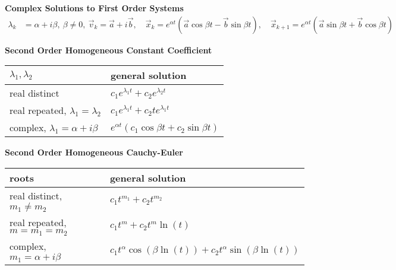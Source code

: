 \begin{center}

    \textbf{Complex Solutions to First Order Systems}
    \begin{align*}
        \lambda_k &= \alpha + i \beta, \ \beta \ne 0 , \ \vec v_k = \vec a + i \vec b, \quad 
        \vec x_k = e^{\alpha t} (\vec a \cos \beta t - \vec b \sin \beta t), 
        \quad 
        \vec x_{k+1} = e^{\alpha t} (\vec a \sin \beta t + \vec b \cos \beta t)
    \end{align*}

    \vspace{4pt}
    \textbf{Second Order Homogeneous Constant Coefficient}
    \begin{tabular}{ p{4.2cm} p{4.6cm} }
        
        $\lambda_1, \lambda_2$ &  general solution 
        \\[2pt] \hline 
        real distinct &  $c_1 e^{\lambda_1 t} + c_2 e^{\lambda_2 t}$\\       
        real repeated, $\lambda_1 = \lambda_2$ & $c_1 e^{\lambda_1 t} + c_2 t e^{\lambda_1 t}$\\
        complex, $\lambda_1 = \alpha + i \beta$ & $e^{\alpha t} \left( c_1 \cos \beta t + c_2 \sin \beta t \right)$\\[2pt] \hline
    \end{tabular}    
    
    \vspace{4pt}
    \textbf{Second Order Homogeneous Cauchy-Euler}
    \begin{tabular}{ p{6.2cm} p{6cm} }
        roots &  general solution 
        \\[2pt] \hline 
        real distinct, $m_1 \ne m_2$ &  $c_1 t^{m_1} + c_2 t^{m_2}$\\       
        real repeated, $m = m_1 = m_2$ & $c_1 t^{m} + c_2 t^m \ln(t)$\\
        complex, $m_1 = \alpha + i \beta$ & $c_1t^{\alpha}\cos(\beta \ln(t)) + c_2t^{\alpha}\sin(\beta \ln (t))$\\[2pt] \hline
    \end{tabular}
    

\end{center}
